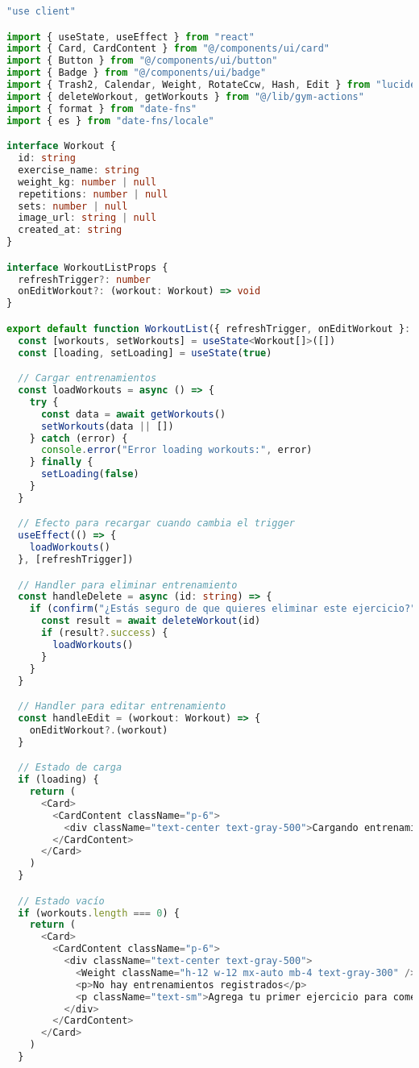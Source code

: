 \documentclass[12pt,a4paper]{article}
\begin{document}
\begin{lstlisting}[language=typescript, caption=components/gym/workout-list.tsx - Estructura principal]
"use client"

import { useState, useEffect } from "react"
import { Card, CardContent } from "@/components/ui/card"
import { Button } from "@/components/ui/button"
import { Badge } from "@/components/ui/badge"
import { Trash2, Calendar, Weight, RotateCcw, Hash, Edit } from "lucide-react"
import { deleteWorkout, getWorkouts } from "@/lib/gym-actions"
import { format } from "date-fns"
import { es } from "date-fns/locale"

interface Workout {
  id: string
  exercise_name: string
  weight_kg: number | null
  repetitions: number | null
  sets: number | null
  image_url: string | null
  created_at: string
}

interface WorkoutListProps {
  refreshTrigger?: number
  onEditWorkout?: (workout: Workout) => void
}

export default function WorkoutList({ refreshTrigger, onEditWorkout }: WorkoutListProps) {
  const [workouts, setWorkouts] = useState<Workout[]>([])
  const [loading, setLoading] = useState(true)

  // Cargar entrenamientos
  const loadWorkouts = async () => {
    try {
      const data = await getWorkouts()
      setWorkouts(data || [])
    } catch (error) {
      console.error("Error loading workouts:", error)
    } finally {
      setLoading(false)
    }
  }

  // Efecto para recargar cuando cambia el trigger
  useEffect(() => {
    loadWorkouts()
  }, [refreshTrigger])

  // Handler para eliminar entrenamiento
  const handleDelete = async (id: string) => {
    if (confirm("¿Estás seguro de que quieres eliminar este ejercicio?")) {
      const result = await deleteWorkout(id)
      if (result?.success) {
        loadWorkouts()
      }
    }
  }

  // Handler para editar entrenamiento
  const handleEdit = (workout: Workout) => {
    onEditWorkout?.(workout)
  }

  // Estado de carga
  if (loading) {
    return (
      <Card>
        <CardContent className="p-6">
          <div className="text-center text-gray-500">Cargando entrenamientos...</div>
        </CardContent>
      </Card>
    )
  }

  // Estado vacío
  if (workouts.length === 0) {
    return (
      <Card>
        <CardContent className="p-6">
          <div className="text-center text-gray-500">
            <Weight className="h-12 w-12 mx-auto mb-4 text-gray-300" />
            <p>No hay entrenamientos registrados</p>
            <p className="text-sm">Agrega tu primer ejercicio para comenzar</p>
          </div>
        </CardContent>
      </Card>
    )
  }


\end{lstlisting}
\end{document}
